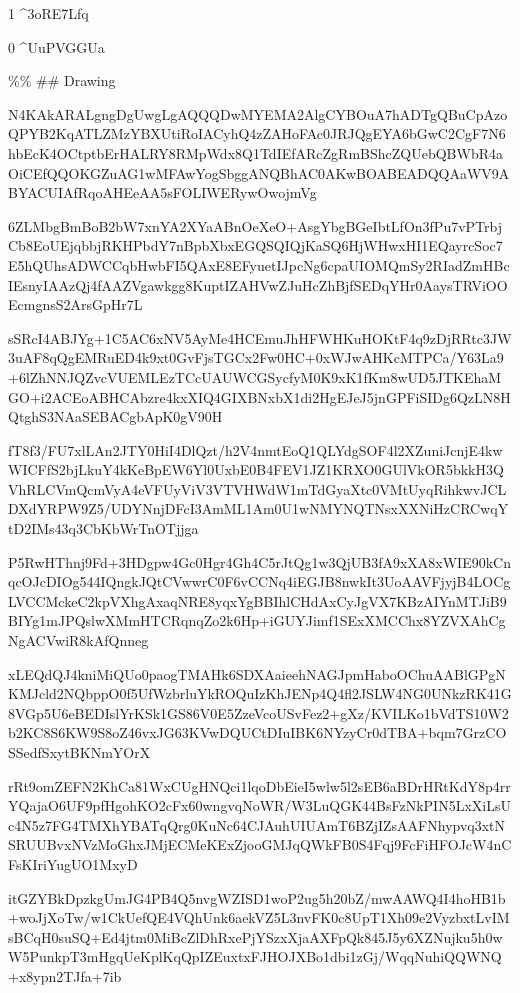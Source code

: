 \documentclass[]{article}
\newenvironment{Shaded}{\begin{snugshade}}{\end{snugshade}}
\newcommand{\NormalTok}[1]{#1}
\begin{document}
1 \^{}3oRE7Lfq

0 \^{}UuPVGGUa

\%\% \#\# Drawing

\begin{Shaded}
\begin{Highlighting}[]
\NormalTok{N4KAkARALgngDgUwgLgAQQQDwMYEMA2AlgCYBOuA7hADTgQBuCpAzoQPYB2KqATLZMzYBXUtiRoIACyhQ4zZAHoFAc0JRJQgEYA6bGwC2CgF7N6hbEcK4OCtptbErHALRY8RMpWdx8Q1TdIEfARcZgRmBShcZQUebQBWbR4aOiCEfQQOKGZuAG1wMFAwYogSbggANQBhAC0AKwBOABEADQQAaWV9ABYACUIAfRqoAHEeAA5sFOLIWERywOwojmVg}

\NormalTok{6ZLMbgBmBoB2bW7xnYA2XYaABnOeXeO+AsgYbgBGeIbtLfOn3fPu7vPTrbjCb8EoUEjqbbjRKHPbdY7nBpbXbxEGQSQIQjKaSQ6HjWHwxHI1EQayrcSoc7E5hQUhsADWCCqbHwbFI5QAxE8EFyuetIJpcNg6cpaUIOMQmSy2RIadZmHBcIEsnyIAAzQj4fAAZVgawkgg8KuptIZAHVwZJuHcZhBjfSEDqYHr0AaysTRViOOEcmgnsS2ArsGpHr7L}

\NormalTok{sSRcI4ABJYg+1C5AC6xNV5AyMe4HCEmuJhHFWHKuHOKtF4q9zDjRRtc3JW3uAF8qQgEMRuED4k9xt0GvFjsTGCx2Fw0HC+0xWJwAHKcMTPCa/Y63La9+6lZhNNJQZvcVUEMLEzTCcUAUWCGSycfyM0K9xK1fKm8wUD5JTKEhaMGO+i2ACEoABHCAbzre4kxXIQ4GIXBNxbX1di2HgEJeJ5jnGPFiSIDg6QzLN8HQtghS3NAaSEBACgbApK0gV90H}

\NormalTok{fT8f3/FU7xlLAn2JTY0HiI4DlQzt/h2V4nmtEoQ1QLYdgSOF4l2XZuniJcnjE4kwWICFfS2bjLkuY4kKeBpEW6Yl0UxbE0B4FEV1JZ1KRXO0GUlVkOR5bkkH3QVhRLCVmQcmVyA4eVFUyViV3VTVHWdW1mTdGyaXtc0VMtUyqRihkwvJCLDXdYRPW9Z5/UDYNnjDFcI3AmML1Am0U1wNMYNQTNsxXXNiHzCRCwqYtD2IMs43q3CbKbWrTnOTjjga}

\NormalTok{P5RwHThnj9Fd+3HDgpw4Gc0Hgr4Gh4C5rJtQg1w3QjUB3fA9xXA8xWIE90kCnqcOJcDIOg544IQngkJQtCVwwrC0F6vCCNq4iEGJB8nwkIt3UoAAVFjyjB4LOCgLVCCMckeC2kpVXhgAxaqNRE8yqxYgBBIhlCHdAxCyJgVX7KBzAIYnMTJiB9BIYg1mJPQslwXMmHTCRqnqZo2k6Hp+iGUYJimf1SExXMCChx8YZVXAhCgNgACVwiR8kAfQnneg}

\NormalTok{xLEQdQJ4kniMiQUo0paogTMAHk6SDXAaieehNAGJpmHaboOChuAABlGPgNKMJcld2NQbppO0f5UfWzbrluYkROQuIzKhJENp4Q4fl2JSLW4NG0UNkzRK41G8VGp5U6eBEDIslYrKSk1GS86V0E5ZzeVcoUSvFez2+gXz/KVILKo1bVdTS10W2b2KC8S6KW9S8oZ46vxJG63KVwDQUCtDIuIBK6NYzyCr0dTBA+bqm7GrzCOSSedfSxytBKNmYOrX}

\NormalTok{rRt9omZEFN2KhCa81WxCUgHNQci1lqoDbEieI5wlw5l2sEB6aBDrHRtKdY8p4rrYQajaO6UF9pfHgohKO2cFx60wngvqNoWR/W3LuQGK44BsFzNkPIN5LxXiLsUc4N5z7FG4TMXhYBATqQrg0KuNc64CJAuhUIUAmT6BZjIZsAAFNhypvq3xtNSRUUBvxNVzMoGhxJMjECMeKExZjooGMJqQWkFB0S4Fqj9FcFiHFOJcW4nCFsKIriYugUO1MxyD}

\NormalTok{itGZYBkDpzkgUmJG4PB4Q5nvgWZISD1woP2ug5h20bZ/mwAAWQ4I4hoHB1b+woJjXoTw/w1CkUefQE4VQhUnk6aekVZ5L3nvFK0c8UpT1Xh09e2VyzbxtLvIMsBCqH0suSQ+Ed4jtm0MiBcZlDhRxePjYSzxXjaAXFpQk845J5y6XZNujku5h0wW5PunkpT3mHgqUeKplKqQpIZEuxtxFJHOJXBo1dbi1zGj/WqqNuhiQQWNQ+x8ypn2TJfa+7ib}


\end{Highlighting}
\end{Shaded}
\end{document}
